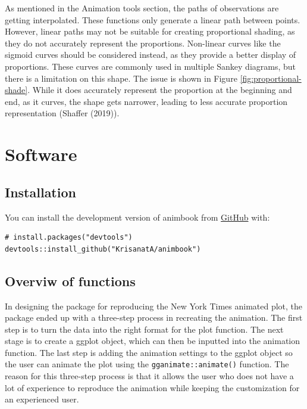 As mentioned in the Animation tools section, the paths of observations are getting interpolated. These functions only generate a linear path between points. However, linear paths may not be suitable for creating proportional shading, as they do not accurately represent the proportions. Non-linear curves like the sigmoid curves should be considered instead, as they provide a better display of proportions. These curves are commonly used in multiple Sankey diagrams, but there is a limitation on this shape. The issue is shown in Figure \ref{fig:proportional-shade}. While it does accurately represent the proportion at the beginning and end, as it curves, the shape gets narrower, leading to less accurate proportion representation (Shaffer (2019)).

\hypertarget{software}{%
\section{Software}\label{software}}

\hypertarget{installation}{%
\subsection{Installation}\label{installation}}

You can install the development version of animbook from \href{https://github.com/KrisanatA/animbook}{GitHub} with:

\begin{verbatim}
# install.packages("devtools")
devtools::install_github("KrisanatA/animbook")
\end{verbatim}

\hypertarget{overviw-of-functions}{%
\subsection{Overviw of functions}\label{overviw-of-functions}}

In designing the package for reproducing the New York Times animated plot, the package ended up with a three-step process in recreating the animation. The first step is to turn the data into the right format for the plot function. The next stage is to create a ggplot object, which can then be inputted into the animation function. The last step is adding the animation settings to the ggplot object so the user can animate the plot using the \texttt{gganimate::animate()} function. The reason for this three-step process is that it allows the user who does not have a lot of experience to reproduce the animation while keeping the customization for an experienced user.

